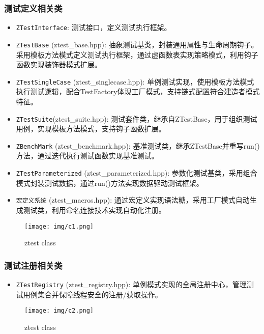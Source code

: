 \documentclass{article}
\begin{document}
\subsubsection{测试定义相关类}
\begin{itemize}
    \item \texttt{ZTestInterface}:  测试接口，定义测试执行框架。
    \item \texttt{ZTestBase} (ztest\_base.hpp): 抽象测试基类，封装通用属性与生命周期钩子。采用模板方法模式定义测试执行框架，通过虚函数表实现策略模式，利用钩子函数实现装饰器模式扩展。
    \item \texttt{ZTestSingleCase} (ztest\_singlecase.hpp): 单例测试实现，使用模板方法模式执行测试逻辑，配合TestFactory体现工厂模式，支持链式配置符合建造者模式特征。
    \item \texttt{ZTestSuite}(ztest\_suite.hpp): 测试套件类，继承自ZTestBase，用于组织测试用例，实现模板方法模式，支持钩子函数扩展。
    \item \texttt{ZBenchMark} (ztest\_benchmark.hpp): 基准测试类，继承ZTestBase并重写run()方法，通过迭代执行测试函数实现基准测试。
    \item \texttt{ZTestParameterized} (ztest\_parameterized.hpp): 参数化测试基类，采用组合模式封装测试数据，通过run()方法实现数据驱动测试框架。
    \item \texttt{宏定义系统} (ztest\_macros.hpp): 通过宏定义实现语法糖，采用工厂模式自动生成测试类，利用命名连接技术实现自动化注册。
\end{itemize}
\begin{figure}[H]
    \centering
    \texttt{[image: img/c1.png]} %
    \caption{ ztest class}
    \label{fig:ztest class }
\end{figure}

\subsubsection{测试注册相关类}
\begin{itemize}
    \item \texttt{ZTestRegistry} (ztest\_registry.hpp): 单例模式实现的全局注册中心，管理测试用例集合并保障线程安全的注册/获取操作。
\end{itemize}
\begin{figure}[H]
    \centering
    \texttt{[image: img/c2.png]} %
    \caption{ ztest class}
    \label{fig:ztest class }
\end{figure}
\end{document}
